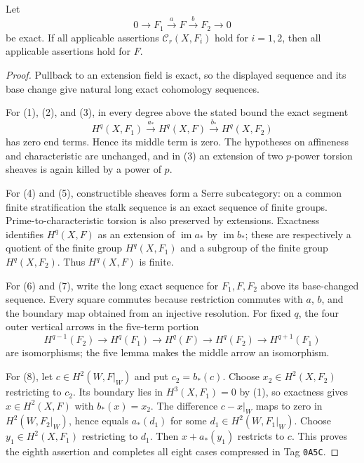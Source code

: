 \begin{lemma}
\label{lemma:weil-pbc-eight-curve-devissage}
Let
\[
 0\longrightarrow F_1\xrightarrow{a}F\xrightarrow{b}F_2\longrightarrow0
\]
be exact.  If all applicable assertions $\mathcal C_r(X,F_i)$ hold for
$i=1,2$, then all applicable assertions hold for $F$.
\end{lemma}
\begin{proof}
Pullback to an extension field is exact, so the displayed sequence and its
base change give natural long exact cohomology sequences.

For (1), (2), and (3), in every degree above the stated bound the exact
segment
\[
 H^q(X,F_1)\xrightarrow{a_*}H^q(X,F)
 \xrightarrow{b_*}H^q(X,F_2)
\]
has zero end terms.  Hence its middle term is zero.  The hypotheses on
affineness and characteristic are unchanged, and in (3) an extension of two
$p$-power torsion sheaves is again killed by a power of $p$.

For (4) and (5), constructible sheaves form a Serre subcategory: on a common
finite stratification the stalk sequence is an exact sequence of finite
groups.  Prime-to-characteristic torsion is also preserved by extensions.
Exactness identifies $H^q(X,F)$ as an extension of
$\operatorname{im}a_*$ by $\operatorname{im}b_*$; these are respectively a
quotient of the finite group $H^q(X,F_1)$ and a subgroup of the finite group
$H^q(X,F_2)$.  Thus $H^q(X,F)$ is finite.

For (6) and (7), write the long exact sequence for $F_1,F,F_2$ above its
base-changed sequence.  Every square commutes because restriction commutes
with $a$, $b$, and the boundary map obtained from an injective resolution.
For fixed $q$, the four outer vertical arrows in the five-term portion
\[
 H^{q-1}(F_2)\to H^q(F_1)\to H^q(F)\to H^q(F_2)\to H^{q+1}(F_1)
\]
are isomorphisms; the five lemma makes the middle arrow an isomorphism.

For (8), let $c\in H^2(W,F|_W)$ and put $c_2=b_*(c)$.  Choose
$x_2\in H^2(X,F_2)$ restricting to $c_2$.  Its boundary lies in
$H^3(X,F_1)=0$ by (1), so exactness gives
$x\in H^2(X,F)$ with $b_*(x)=x_2$.  The difference
$c-x|_W$ maps to zero in $H^2(W,F_2|_W)$, hence equals $a_*(d_1)$ for some
$d_1\in H^2(W,F_1|_W)$.  Choose $y_1\in H^2(X,F_1)$ restricting to $d_1$.
Then $x+a_*(y_1)$ restricts to $c$.  This proves the eighth assertion and
completes all eight cases compressed in Tag \texttt{0A5C}.
\end{proof}


